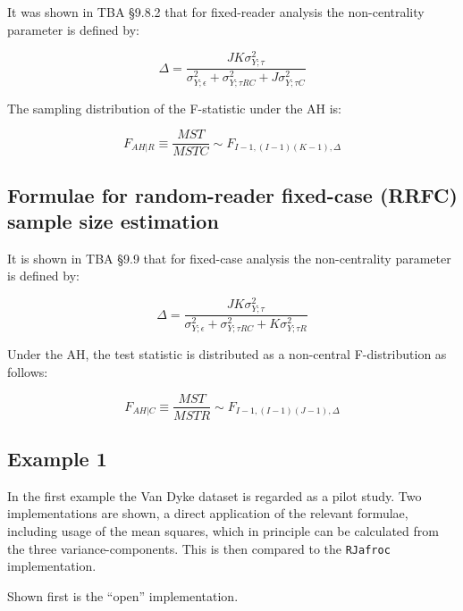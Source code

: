 \documentclass[
]{book}
\begin{document}
It was shown in TBA §9.8.2 that for fixed-reader analysis the non-centrality parameter is defined by:

\begin{equation}
\Delta=\frac{JK\sigma_{Y;\tau}^2}{\sigma_{Y;\epsilon}^2+\sigma_{Y;\tau RC}^2+J\sigma_{Y;\tau C}^2}
\label{eq:DeltaFRRC1}
\end{equation}

The sampling distribution of the F-statistic under the AH is:

\begin{equation}
F_{AH|R}\equiv \frac{MST}{MSTC}\sim F_{I-1,(I-1)(K-1),\Delta}
\label{eq:SamplingFFRRC1}
\end{equation}

\hypertarget{roc-sample-size-or-RRFC-sample-size-estimation}{%
\subsection{Formulae for random-reader fixed-case (RRFC) sample size estimation}\label{roc-sample-size-or-RRFC-sample-size-estimation}}

It is shown in TBA §9.9 that for fixed-case analysis the non-centrality parameter is defined by:

\begin{equation}
\Delta=\frac{JK\sigma_{Y;\tau}^2}{\sigma_{Y;\epsilon}^2+\sigma_{Y;\tau RC}^2+K\sigma_{Y;\tau R}^2}
\label{eq:DeltaFRRFC1}
\end{equation}

Under the AH, the test statistic is distributed as a non-central F-distribution as follows:

\begin{equation}
F_{AH|C}\equiv \frac{MST}{MSTR}\sim F_{I-1,(I-1)(J-1),\Delta}
\label{eq:SamplingFRRFC1}
\end{equation}

\hypertarget{example-1}{%
\subsection{Example 1}\label{example-1}}

In the first example the Van Dyke dataset is regarded as a pilot study. Two implementations are shown, a direct application of the relevant formulae, including usage of the mean squares, which in principle can be calculated from the three variance-components. This is then compared to the \texttt{RJafroc} implementation.

Shown first is the ``open'' implementation.
\end{document}
